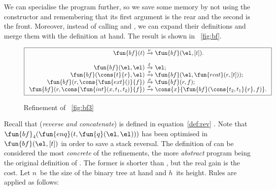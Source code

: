 We can specialise the program further, so we save some memory by not
using the constructor  and remembering
that its first argument is the rear and the second is the
front. Moreover, instead of calling 
and , we can expand their
definitions and merge them with the definition at hand. The result is
shown in \fig~\vref{fig:bf}.
\begin{figure}[b]
\begin{equation*}
\boxed{
\begin{array}{r@{\;}c@{\;}l}
\fun{bf}(t) & \xrightarrow{\smash{\nu}} & \fun{bf}(\el,[t]).\\
\\
\fun{bf}(\el,\el) & \xrightarrow{\smash{\xi}} & \el;\\
\fun{bf}(\cons{t}{r},\el) & \xrightarrow{\smash{\pi}} &
  \fun{bf}(\el,\fun{rcat}(r,[t]));\\
\fun{bf}(r,\cons{\fun{ext}()}{f})
  & \xrightarrow{\smash{\rho}} & \fun{bf}(r,f);\\
\fun{bf}(r,\cons{\fun{int}(x,t_1,t_2)}{f})
  & \xrightarrow{\smash{\sigma}}
  & \cons{x}{\fun{bf}(\cons{t_2,t_1}{r},f)}.
\end{array}}
\end{equation*}
\caption{Refinement of \fig~\vref{fig:bf3}}
\label{fig:bf}
\end{figure}
Recall that  (\emph{reverse and
  concatenate}) is defined in equation~\eqref{def:rev}
. Note that
\(\fun{bf}_4(\fun{enq}(t,\fun{q}(\el,\el)))\)
has been optimised in \(\fun{bf}(\el,[t])\) in
order to save a stack reversal. The definition of
 can be considered the most
\emph{concrete} of the refinements, the more \emph{abstract} program
being the original definition of
. The former is shorter
than , but the real gain
is the cost. Let \(n\)~be the size of the binary tree at hand and
\(h\)~its height. Rules are applied as
follows:

